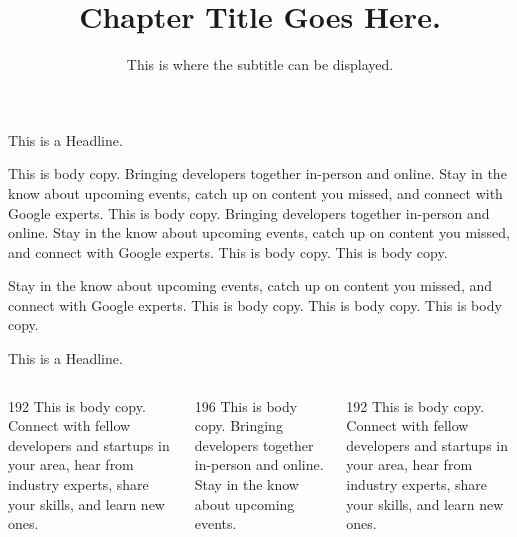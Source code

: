 \documentclass[aspectratio=169]{beamer}
\title{Chapter \textbf{Title} Goes Here.}
\subtitle{This is where the subtitle can be displayed.}
\begin{document}
\begin{frame}[plain]
  \titlepage
\end{frame}

\begin{frame}{This is a Headline.}
  \begin{minipage}[t]{443\gpt}
  This is body copy. Bringing developers together in-person and online. Stay in the know
  about upcoming events, catch up on content you missed, and connect with Google experts.
  This is body copy. Bringing developers together in-person and online. Stay in the know
  about upcoming events, catch up on content you missed, and connect with Google experts.
  This is body copy. This is body copy.

  Stay in the know about upcoming events, catch up on content you missed, and connect with
  Google experts. This is body copy. This is body copy. This is body copy.
  \end{minipage}
\end{frame}

\begin{frame}{This is a Headline.}
  \begin{columns}[T]
    \begin{column}{192\gpt}
      This is body copy. Connect with fellow developers and startups in your area, hear from
      industry experts, share your skills, and learn new ones.
    \end{column}
    \begin{column}{196\gpt}
      This is body copy. Bringing developers together in-person and online. Stay in the know
      about upcoming events.
    \end{column}
    \begin{column}{192\gpt}
      This is body copy. Connect with fellow developers and startups in your area, hear from
      industry experts, share your skills, and learn new ones.
    \end{column}
  \end{columns}
\end{frame}
\end{document}
